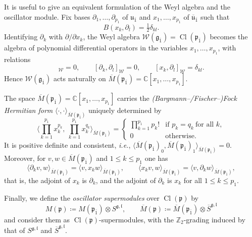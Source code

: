 \documentclass[11pt]{amsart}
\newcommand{\bracket}{{\langle \cdot,\cdot \rangle}}
\def\CC{{\mathbb C}}
\def\ubar{{\overline{\mathfrak{u}}}}
\def\spinbar{{\overline{S}^{\gg,\ll}}}
\def\spin{{S^{\gg,\ll}}}
\def\spinbar{{\overline{S}^{\gg,\ll}}}
\def\Cl{{\operatorname{Cl}}}
\def\pp{{\mathfrak p}}
\def\uu{{\mathfrak u}}
\def\ll{{\mathfrak l}}
\def\odd{{\mathfrak{g}_{\bar{1}}}}
\def\pp{{\mathfrak p}}
\def\pp{{\mathfrak{p}}}
\def\gg{{\mathfrak{g}}}
\def\ZZ{{\mathbb Z}}
\def\Weyl{{\mathscr{W}(\odd)}}
\theoremstyle{plain}
\theoremstyle{remark}
\theoremstyle{definition}
\numberwithin{equation}{section}
\theoremstyle{remark}
\begin{document}
It is useful to give an equivalent formulation of the Weyl algebra and the oscillator module. Fix bases $\partial_1,\dots,\partial_{p_1}$ of $\uu_{\bar 1}$ and $x_1,\dots,x_{p_1}$ of $\ubar_{\bar 1}$
such that
\begin{equation}
B(x_k,\partial_l)=\tfrac12\delta_{kl}.
\end{equation}
Identifying $\partial_k$ with $\partial/\partial x_k$, the Weyl algebra $\Weyl=\Cl(\pp_{\bar 1})$ becomes the
algebra of polynomial differential operators in the variables $x_1,\dots,x_{p_1}$, with relations
\begin{equation}
[x_k,x_l]_{\mathscr{W}}=0,\qquad [\partial_k,\partial_l]_{\mathscr{W}}=0,\qquad [x_k,\partial_l]_{\mathscr{W}}=\delta_{kl}.
\end{equation}
Hence $\Weyl$ acts naturally on $\overline M(\pp_{\bar 1})=\CC[x_1,\dots,x_{p_1}]$.

The space $\overline{M}(\pp_{\bar{1}})=\CC[x_{1},\ldots,x_{p_{1}}]$ carries the \emph{(Bargmann--/Fischer--)Fock
Hermitian form} $\bracket_{\overline{M}(\pp_{\bar{1}})}$ uniquely determined by
\begin{equation}
\Big\langle \prod_{k=1}^{p_{1}}x_{k}^{p_{k}},\ \prod_{k=1}^{p_{1}}x_{k}^{q_{k}}\Big\rangle_{\overline{M}(\pp_{\bar{1}})}
=
\begin{cases}
\prod_{k=1}^{p_{1}}p_{k}! & \text{if } p_{k}=q_{k}\ \text{for all } k,\\
0 & \text{otherwise}.
\end{cases}
\end{equation}
It is positive definite and consistent, \emph{i.e.},
$\langle \overline{M}(\pp_{\bar{1}})_{0},\overline{M}(\pp_{\bar{1}})_{1}\rangle_{\overline{M}(\pp_{\bar{1}})}=0$.
Moreover, for $v,w\in \overline{M}(\pp_{\bar{1}})$ and $1\le k\le p_{1}$ one has
\begin{equation}
\langle \partial_{k} v,w\rangle_{\overline{M}(\pp_{\bar{1}})}
=
\langle v,x_{k} w\rangle_{\overline{M}(\pp_{\bar{1}})},
\qquad
\langle x_{k} v,w\rangle_{\overline{M}(\pp_{\bar{1}})}
=
\langle v,\partial_{k} w\rangle_{\overline{M}(\pp_{\bar{1}})},
\end{equation}
that is, the adjoint of $x_{k}$ is $\partial_{k}$, and the adjoint of
$\partial_{k}$ is $x_{k}$ for all $1\le k\le p_{1}$.

Finally, we define the \emph{oscillator supermodules} over $\Cl(\pp)$ by
\begin{equation} \label{eq::definition_M_p}
M(\pp)\coloneqq M(\pp_{\bar{1}}) \otimes \spin, \qquad \overline{M}(\pp)\coloneqq \overline{M}(\pp_{\bar{1}}) \otimes \spinbar
\end{equation}
and consider them as $\Cl(\pp)$-supermodules, with the $\ZZ_{2}$-grading induced by that of $\spin$ and $\spinbar$.
\end{document}
